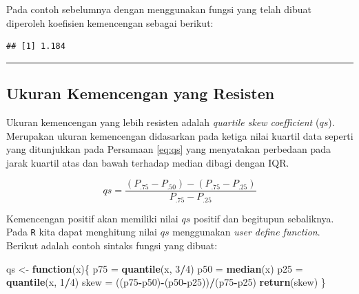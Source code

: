 \documentclass[]{book}
\newenvironment{Shaded}{\begin{snugshade}}{\end{snugshade}}
\newcommand{\KeywordTok}[1]{\textcolor[rgb]{0.13,0.29,0.53}{\textbf{#1}}}
\newcommand{\DecValTok}[1]{\textcolor[rgb]{0.00,0.00,0.81}{#1}}
\newcommand{\StringTok}[1]{\textcolor[rgb]{0.31,0.60,0.02}{#1}}
\newcommand{\ControlFlowTok}[1]{\textcolor[rgb]{0.13,0.29,0.53}{\textbf{#1}}}
\newcommand{\OperatorTok}[1]{\textcolor[rgb]{0.81,0.36,0.00}{\textbf{#1}}}
\newcommand{\NormalTok}[1]{#1}
\begin{document}
Pada contoh sebelumnya dengan menggunakan fungsi yang telah dibuat
diperoleh koefisien kemencengan sebagai berikut:

\begin{Shaded}
\end{Shaded}

\begin{verbatim}
## [1] 1.184
\end{verbatim}

\begin{center}\rule{0.5\linewidth}{\linethickness}\end{center}

\subsection{Ukuran Kemencengan yang
Resisten}\label{ukuran-kemencengan-yang-resisten}

Ukuran kemencengan yang lebih resisten adalah \emph{quartile skew
coefficient} (\(qs\)). Merupakan ukuran kemencengan didasarkan pada
ketiga nilai kuartil data seperti yang ditunjukkan pada Persamaan
\eqref{eq:qs} yang menyatakan perbedaan pada jarak kuartil atas dan bawah
terhadap median dibagi dengan IQR.

\begin{equation}
  qs=\frac{\left(P_{.75}-P_{.50}\right)-\left(P_{.75}-P_{.25}\right)}{P_{.75}-P_{.25}}
  \label{eq:qs}
\end{equation}

Kemencengan positif akan memiliki nilai \(qs\) positif dan begitupun
sebaliknya. Pada \texttt{R} kita dapat menghitung nilai \(qs\)
menggunakan \emph{user define function}. Berikut adalah contoh sintaks
fungsi yang dibuat:

\begin{Shaded}
\begin{Highlighting}[]
\NormalTok{qs <-}\StringTok{ }\ControlFlowTok{function}\NormalTok{(x)\{}
\NormalTok{  p75 =}\StringTok{ }\KeywordTok{quantile}\NormalTok{(x, }\DecValTok{3}\OperatorTok{/}\DecValTok{4}\NormalTok{)}
\NormalTok{  p50 =}\StringTok{ }\KeywordTok{median}\NormalTok{(x)}
\NormalTok{  p25 =}\StringTok{ }\KeywordTok{quantile}\NormalTok{(x, }\DecValTok{1}\OperatorTok{/}\DecValTok{4}\NormalTok{)}
\NormalTok{  skew =}\StringTok{ }\NormalTok{((p75}\OperatorTok{-}\NormalTok{p50)}\OperatorTok{-}\NormalTok{(p50}\OperatorTok{-}\NormalTok{p25))}\OperatorTok{/}\NormalTok{(p75}\OperatorTok{-}\NormalTok{p25)}
  \KeywordTok{return}\NormalTok{(skew)}
\NormalTok{\}}
\end{Highlighting}
\end{Shaded}
\end{document}

